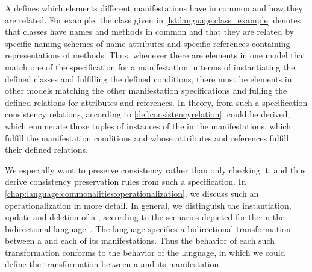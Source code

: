 A \commonality defines which elements different manifestations have in common and how they are related.
For example, the class \commonality given in \autoref{lst:language:class_example} denotes that classes have names and methods in common and that they are related by specific naming schemes of name attributes and specific references containing representations of methods.
Thus, whenever there are elements in one model that match one of the specification for a manifestation in terms of instantiating the defined classes and fulfilling the defined conditions, there must be elements in other models matching the other manifestation specifications and fulling the defined relations for attributes and references.
In theory, from such a specification consistency relations, according to \autoref{def:consistencyrelation}, could be derived, which enumerate those tuples of instances of the \metaclasses in the manifestations, which fulfill the manifestation conditions and whose attributes and references fulfill their defined relations.

We especially want to preserve consistency rather than only checking it, and thus derive consistency preservation rules from such a specification.
In \autoref{chap:language:commonalities:operationalization}, we discuss such an operationalization in more detail.
In general, we distinguish the instantiation, update and deletion of a \commonality, according to the scenarios depicted for \mappings the in the bidirectional \mappings language~\cite[Sec. 7.2.1]{klare2020Vitruv-JSS}.
The \commonalities language specifies a bidirectional transformation between a \commonality and each of its manifestations.
Thus the behavior of each such transformation conforms to the behavior of the \mappings language, in which we could define the transformation between a \commonality and its manifestation.

